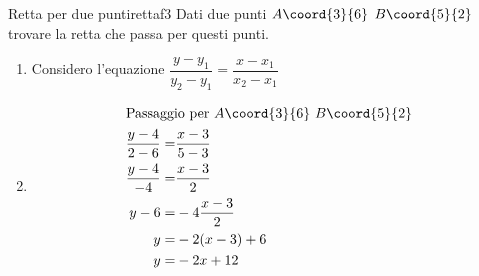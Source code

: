\begin{esempiot}{Retta per due punti}{rettaf3}
	Dati due punti $A\coord{3}{6}$ $B\coord{5}{2}$ trovare la retta che passa per questi punti.
\end{esempiot}
\begin{enumerate}
	\item Considero l'equazione  $\dfrac{y-y_1}{y_2-y_1}=\dfrac{x-x_1}{x_2-x_1}$
	\item \begin{align*}
		\intertext{Passaggio per $A\coord{3}{6}$ $B\coord{5}{2}$ }
	\dfrac{y-4}{2-6}=&\dfrac{x-3}{5-3}\\
	\dfrac{y-4}{-4}=&\dfrac{x-3}{2}\\
		y-6=&-4\dfrac{x-3}{2}\\
		y=&-2(x-3)+6\\
		y=&-2x+12
	\end{align*}
\end{enumerate}
